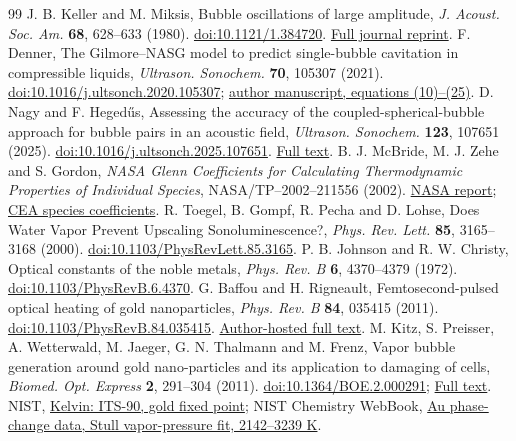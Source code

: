 \begin{thebibliography}{99}\small
{} J. B. Keller and M. Miksis, Bubble oscillations of large amplitude, \emph{J. Acoust. Soc. Am.} \textbf{68}, 628--633 (1980). \href{https://doi.org/10.1121/1.384720}{doi:10.1121/1.384720}. \href{https://archive.org/download/DTIC_ADA095754/DTIC_ADA095754.pdf}{Full journal reprint}.
 F. Denner, The Gilmore--NASG model to predict single-bubble cavitation in compressible liquids, \emph{Ultrason. Sonochem.} \textbf{70}, 105307 (2021). \href{https://doi.org/10.1016/j.ultsonch.2020.105307}{doi:10.1016/j.ultsonch.2020.105307}; \href{https://arxiv.org/abs/2008.04332v2}{author manuscript, equations (10)--(25)}.
 D. Nagy and F. Heged\H us, Assessing the accuracy of the coupled-spherical-bubble approach for bubble pairs in an acoustic field, \emph{Ultrason. Sonochem.} \textbf{123}, 107651 (2025). \href{https://doi.org/10.1016/j.ultsonch.2025.107651}{doi:10.1016/j.ultsonch.2025.107651}. \href{https://pmc.ncbi.nlm.nih.gov/articles/PMC12641221/}{Full text}.
 B. J. McBride, M. J. Zehe and S. Gordon, \emph{NASA Glenn Coefficients for Calculating Thermodynamic Properties of Individual Species}, NASA/TP--2002--211556 (2002). \href{https://ntrs.nasa.gov/citations/20020085330}{NASA report}; \href{https://github.com/nasa/cea/blob/main/data/thermo.inp}{CEA species coefficients}.
 R. Toegel, B. Gompf, R. Pecha and D. Lohse, Does Water Vapor Prevent Upscaling Sonoluminescence?, \emph{Phys. Rev. Lett.} \textbf{85}, 3165--3168 (2000). \href{https://doi.org/10.1103/PhysRevLett.85.3165}{doi:10.1103/PhysRevLett.85.3165}.
 P. B. Johnson and R. W. Christy, Optical constants of the noble metals, \emph{Phys. Rev. B} \textbf{6}, 4370--4379 (1972). \href{https://doi.org/10.1103/PhysRevB.6.4370}{doi:10.1103/PhysRevB.6.4370}.
 G. Baffou and H. Rigneault, Femtosecond-pulsed optical heating of gold nanoparticles, \emph{Phys. Rev. B} \textbf{84}, 035415 (2011). \href{https://doi.org/10.1103/PhysRevB.84.035415}{doi:10.1103/PhysRevB.84.035415}. \href{https://guillaume.baffou.com/publications/015-Baffou-PRB84_035415.pdf}{Author-hosted full text}.
 M. Kitz, S. Preisser, A. Wetterwald, M. Jaeger, G. N. Thalmann and M. Frenz, Vapor bubble generation around gold nano-particles and its application to damaging of cells, \emph{Biomed. Opt. Express} \textbf{2}, 291--304 (2011). \href{https://doi.org/10.1364/BOE.2.000291}{doi:10.1364/BOE.2.000291}; \href{https://pmc.ncbi.nlm.nih.gov/articles/PMC3038445/}{Full text}.
 NIST, \href{https://www.nist.gov/si-redefinition/kelvin/kelvin-its-90}{Kelvin: ITS-90, gold fixed point}; NIST Chemistry WebBook, \href{https://webbook.nist.gov/cgi/cbook.cgi?ID=C7440575\&Mask=4}{Au phase-change data, Stull vapor-pressure fit, 2142--3239 K}.

\end{thebibliography}
